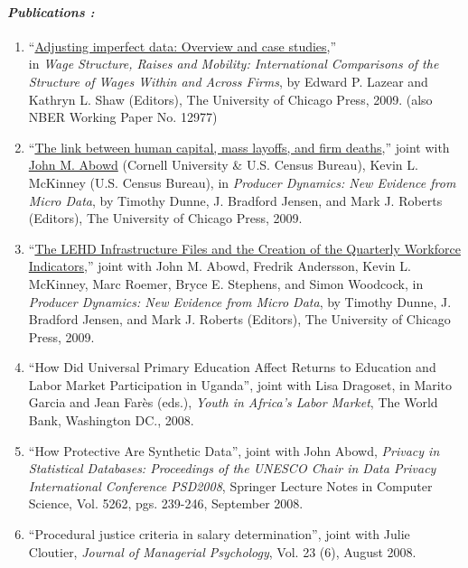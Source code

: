 \documentclass[10pt,letterpaper]{report}
\begin{document}
\paragraph{\it \bf Publications :}%
\begin{enumerate}
\item ``\href{http://www.vilhuber.com/lars/papers/index.php?ser_id=2&search=adjusting+imperfect&ssub=Go}{Adjusting imperfect data: Overview and case studies},'' \\
      in {\it Wage Structure, Raises and Mobility: International
      Comparisons of the Structure of Wages Within and Across Firms}, by 
Edward P. Lazear and Kathryn L. Shaw (Editors),  The University of Chicago
Press, 2009. (also NBER Working Paper No. 12977)
\item
  ``\href{http://www.vilhuber.com/lars/papers/index.php?year=&ser_id=2&search=firm+death&ssub=Go}{The link between human capital, mass layoffs, and firm deaths},'' joint with \href{mailto:john_abowd@cornell.edu}{John M. Abowd} (Cornell University \& U.S. Census Bureau), Kevin L. McKinney (U.S. Census Bureau),  in {\it Producer Dynamics: New Evidence from Micro Data}, by Timothy Dunne, J. Bradford Jensen, and Mark J. Roberts (Editors), 
 The University of Chicago Press, 2009.
\item
  ``\href{http://www.vilhuber.com/lars/papers/index.php?year=&ser_id=2&search=LEHD&ssub=Go}{The LEHD Infrastructure Files and the Creation of the Quarterly Workforce Indicators},'' joint with John M. Abowd, Fredrik Andersson, Kevin L. McKinney, Marc Roemer, Bryce E. Stephens, and Simon Woodcock,  in {\it Producer Dynamics: New Evidence from Micro Data}, by Timothy Dunne, J. Bradford Jensen, and Mark J. Roberts (Editors), 
 The University of Chicago Press, 2009.

\item ``How Did Universal Primary Education Affect Returns to Education and
  Labor Market Participation in Uganda'', joint with Lisa Dragoset, in
  Marito Garcia and Jean Far\`es (eds.), {\it Youth in Africa's Labor
    Market}, The World Bank, Washington DC., 2008.
\item ``How Protective Are Synthetic Data'', joint with
  John Abowd, {\it Privacy in Statistical Databases: Proceedings of the
    UNESCO Chair in Data Privacy International Conference PSD2008},
  Springer Lecture Notes in Computer Science, Vol. 5262, pgs. 239-246, September 2008.

\item ``Procedural justice criteria in salary determination'', joint with
  Julie Cloutier, {\it Journal of Managerial Psychology}, Vol. 23 (6),
  August 2008.


\end{enumerate}
\end{document}
